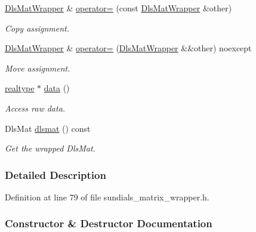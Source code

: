 \begin{DoxyCompactItemize}
\mbox{\hyperlink{classamici_1_1_dls_mat_wrapper}{Dls\+Mat\+Wrapper}} \& \mbox{\hyperlink{classamici_1_1_dls_mat_wrapper_a2eb473e18629e3a3890c9d2e65798f8d}{operator=}} (const \mbox{\hyperlink{classamici_1_1_dls_mat_wrapper}{Dls\+Mat\+Wrapper}} \&other)
\begin{DoxyCompactList}\small\item\em Copy assignment. \end{DoxyCompactList}\item 
\mbox{\hyperlink{classamici_1_1_dls_mat_wrapper}{Dls\+Mat\+Wrapper}} \& \mbox{\hyperlink{classamici_1_1_dls_mat_wrapper_acb214b2f2dac5b32edfed3083d2c3e06}{operator=}} (\mbox{\hyperlink{classamici_1_1_dls_mat_wrapper}{Dls\+Mat\+Wrapper}} \&\&other) noexcept
\begin{DoxyCompactList}\small\item\em Move assignment. \end{DoxyCompactList}\item 
\mbox{\hyperlink{namespaceamici_a1bdce28051d6a53868f7ccbf5f2c14a3}{realtype}} $\ast$ \mbox{\hyperlink{classamici_1_1_dls_mat_wrapper_ace31bbb9df6dd42f70286108ecafa01b}{data}} ()
\begin{DoxyCompactList}\small\item\em Access raw data. \end{DoxyCompactList}\item 
Dls\+Mat \mbox{\hyperlink{classamici_1_1_dls_mat_wrapper_aa1bd2d019ffbf5e652bc0edef4d01552}{dlsmat}} () const
\begin{DoxyCompactList}\small\item\em Get the wrapped Dls\+Mat. \end{DoxyCompactList}\end{DoxyCompactItemize}


\subsubsection{Detailed Description}


Definition at line 79 of file sundials\+\_\+matrix\+\_\+wrapper.\+h.



\subsubsection{Constructor \& Destructor Documentation}
\mbox{\label{classamici_1_1_dls_mat_wrapper_aa349fca7529d8cee5def97c93cc057b9}} 
